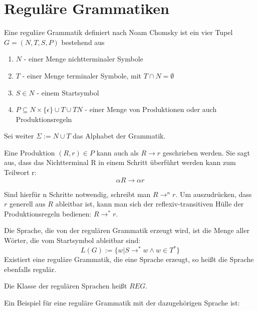 \documentclass[a4paper,12pt]{report}
\begin{document}



\section{Reguläre Grammatiken}
Eine reguläre Grammatik definiert nach Noam Chomsky ist ein vier Tupel 
$G = (N,T,S,P)$ bestehend aus 

\begin{enumerate}
\item $N$ - einer Menge nichtterminaler Symbole 
\item $T$ - einer Menge terminaler Symbole, mit $T\cap N = \emptyset$
\item $S\in N$ - einem Startsymbol
\item $P \subseteq N\times \{\epsilon\}\cup T \cup TN$ - einer Menge von Produktionen oder auch Produktionsregeln
\end{enumerate}

Sei weiter $\Sigma := N \cup T$ das Alphabet der Grammatik.

Eine Produktion $(R,r)\in P$ kann auch als $R\rightarrow r$ geschrieben werden.
Sie sagt aus, dass das Nichtterminal R in einem Schritt überführt werden kann zum Teilwort r:
\[ \alpha R \rightarrow \alpha r \]

Sind hierfür n Schritte notwendig, schreibt man $R \rightarrow^n r$. Um auszudrücken, dass $r$ generell aus $R$ ableitbar ist, kann man sich der reflexiv-transitiven Hülle der Produktionsregeln bedienen: $R \rightarrow ^* r$.

Die Sprache, die von der regulären Grammatik erzeugt wird, ist die Menge aller Wörter, die vom Startsymbol ableitbar sind: 
\[ L(G) := \{w | S \rightarrow^* w \land w\in T^* \} \]
Existiert eine reguläre Grammatik, die eine Sprache erzeugt, so heißt die Sprache ebenfalls regulär.

Die Klasse der regulären Sprachen heißt $REG$.

Ein Beispiel für eine reguläre Grammatik mit der dazugehörigen Sprache ist: 
\end{document}
